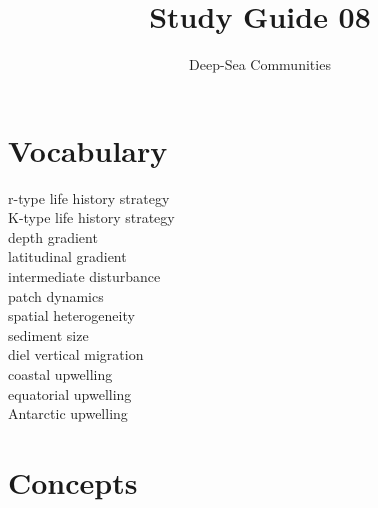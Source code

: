 \documentclass[nofonts, letterpaper]{tufte-handout}
\title{Study Guide 08}
\author{Deep-Sea Communities}
\date{} %
\begin{document}
\maketitle	%


\section{Vocabulary}
\vspace{-1\baselineskip}
\begin{multicols}{2}
r-type life history strategy \\
K-type life history strategy \\
depth gradient \\
latitudinal gradient \\
intermediate disturbance \\
patch dynamics \\
spatial heterogeneity \\
sediment size \\
diel vertical migration \\
coastal upwelling\\
equatorial upwelling\\
Antarctic upwelling
\end{multicols}

\section{Concepts}
\end{document}
